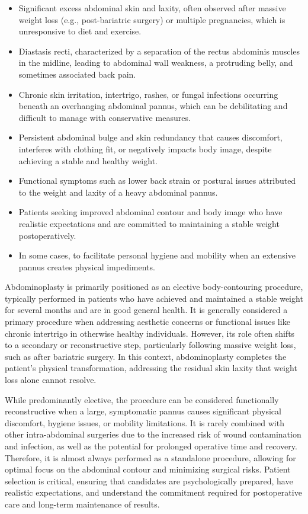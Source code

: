 \begin{itemize}
  \item Significant excess abdominal skin and laxity, often observed after massive weight loss (e.g., post-bariatric surgery) or multiple pregnancies, which is unresponsive to diet and exercise.
  \item Diastasis recti, characterized by a separation of the rectus abdominis muscles in the midline, leading to abdominal wall weakness, a protruding belly, and sometimes associated back pain.
  \item Chronic skin irritation, intertrigo, rashes, or fungal infections occurring beneath an overhanging abdominal pannus, which can be debilitating and difficult to manage with conservative measures.
  \item Persistent abdominal bulge and skin redundancy that causes discomfort, interferes with clothing fit, or negatively impacts body image, despite achieving a stable and healthy weight.
  \item Functional symptoms such as lower back strain or postural issues attributed to the weight and laxity of a heavy abdominal pannus.
  \item Patients seeking improved abdominal contour and body image who have realistic expectations and are committed to maintaining a stable weight postoperatively.
  \item In some cases, to facilitate personal hygiene and mobility when an extensive pannus creates physical impediments.
\end{itemize}

Abdominoplasty is primarily positioned as an elective body-contouring procedure, typically performed in patients who have achieved and maintained a stable weight for several months and are in good general health. It is generally considered a primary procedure when addressing aesthetic concerns or functional issues like chronic intertrigo in otherwise healthy individuals. However, its role often shifts to a secondary or reconstructive step, particularly following massive weight loss, such as after bariatric surgery. In this context, abdominoplasty completes the patient's physical transformation, addressing the residual skin laxity that weight loss alone cannot resolve.

While predominantly elective, the procedure can be considered functionally reconstructive when a large, symptomatic pannus causes significant physical discomfort, hygiene issues, or mobility limitations. It is rarely combined with other intra-abdominal surgeries due to the increased risk of wound contamination and infection, as well as the potential for prolonged operative time and recovery. Therefore, it is almost always performed as a standalone procedure, allowing for optimal focus on the abdominal contour and minimizing surgical risks. Patient selection is critical, ensuring that candidates are psychologically prepared, have realistic expectations, and understand the commitment required for postoperative care and long-term maintenance of results.

